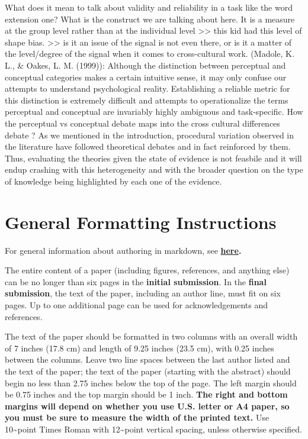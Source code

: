 \documentclass[10pt, letterpaper]{article}
\begin{document}
What does it mean to talk about validity and reliability in a task like
the word extension one? What is the construct we are talking about here.
It is a measure at the group level rather than at the individual level
\textgreater\textgreater{} this kid had this level of shape bias.
\textgreater\textgreater{} is it an issue of the signal is not even
there, or is it a matter of the level/degree of the signal when it comes
to cross-cultural work. (Madole, K. L., \& Oakes, L. M. (1999)):
Although the distinction between perceptual and conceptual categories
makes a certain intuitive sense, it may only confuse our attempts to
understand psychological reality. Establishing a reliable metric for
this distinction is extremely difficult and attempts to operationalize
the terms perceptual and conceptual are invariably highly ambiguous and
task-specific. How the perceptual vs conceptual debate maps into the
cross cultural differences debate ? As we mentioned in the introduction,
procedural variation observed in the literature have followed
theoretical debates and in fact reinforced by them. Thus, evaluating the
theories given the state of evidence is not feasbile and it will endup
crashing with this heterogeneity and with the broader question on the
type of knowledge being highlighted by each one of the evidence.

\hypertarget{general-formatting-instructions}{%
\section{General Formatting
Instructions}\label{general-formatting-instructions}}

For general information about authoring in markdown, see
\textbf{\href{http://rmarkdown.rstudio.com/authoring_basics.html}{here}.}

The entire content of a paper (including figures, references, and
anything else) can be no longer than six pages in the
\textbf{initial submission}. In the \textbf{final submission}, the text
of the paper, including an author line, must fit on six pages. Up to one
additional page can be used for acknowledgements and references.

The text of the paper should be formatted in two columns with an overall
width of 7 inches (17.8 cm) and length of 9.25 inches (23.5 cm), with
0.25 inches between the columns. Leave two line spaces between the last
author listed and the text of the paper; the text of the paper (starting
with the abstract) should begin no less than 2.75 inches below the top
of the page. The left margin should be 0.75 inches and the top margin
should be 1 inch. \textbf{The right and bottom margins will depend on
whether you use U.S. letter or A4 paper, so you must be sure to
measure the width of the printed text.} Use 10\textasciitilde point
Times Roman with 12\textasciitilde point vertical spacing, unless
otherwise specified.
\end{document}
